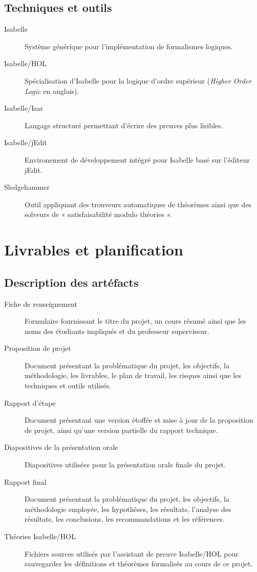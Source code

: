 \documentclass[a4paper, oneside, 12pt, titlepage]{article}
\begin{document}
\subsection{Techniques et outils}

\begin{description}
  \item[Isabelle] Système générique pour l'implémentation de formalismes logiques.
  \item[Isabelle/HOL] Spécialisation d'Isabelle pour la logique d'ordre supérieur (\emph{Higher
    Order Logic} en anglais).
  \item[Isabelle/Isar] Langage structuré permettant d'écrire des preuves plus lisibles.
  \item[Isabelle/jEdit] Environement de développement intégré pour Isabelle basé sur l'éditeur
    jEdit.
  \item[Sledgehammer] Outil appliquant des trouveurs automatiques de théorèmes ainsi que des
    solveurs de « satisfaisabilité modulo théories ».
\end{description}

\section{Livrables et planification}

\subsection{Description des artéfacts}


\begin{description}
  \item[Fiche de renseignement]
    Formulaire fournissant le titre du projet, un cours résumé ainsi que les noms des étudiants
    impliqués et du professeur superviseur.
  \item[Proposition de projet]
    Document présentant la problématique du projet, les objectifs, la méthodologie, les livrables,
    le plan de travail, les risques ainsi que les techniques et outils utilisés.
  \item[Rapport d'étape]
    Document présentant une version étoffée et mise à jour de la proposition de projet, ainsi qu'une
    version partielle du rapport technique.
  \item[Diapositives de la présentation orale]
    Diapositives utilisées pour la présentation orale finale du projet.
  \item[Rapport final]
    Document présentant la problématique du projet, les objectifs, la méthodologie employée, les
    hypothèses, les résultats, l'analyse des résultats, les conclusions, les recommandations et les
    références.
  \item[Théories Isabelle/HOL]
    Fichiers sources utilisés par l'assistant de preuve Isabelle/HOL pour sauvegarder les
    définitions et théorèmes formalisés au cours de ce projet.
\end{description}
\end{document}
